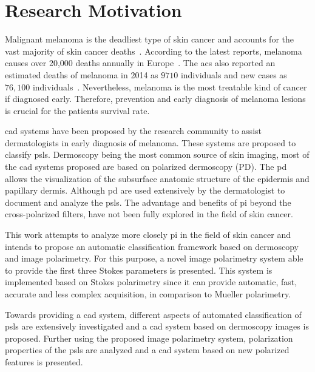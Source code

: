 \section{Research Motivation}
\label{sec:chp1sec6}
Malignant melanoma is the deadliest type of skin cancer and accounts for the vast majority of skin cancer deaths~\cite{CancerFactsFigures2014}.
According to the latest reports, melanoma causes over 20,000 deaths annually in Europe~\cite{forsea2012melanoma}.
The \Ac{acs} also reported an estimated deaths of melanoma in 2014 as $9710$ individuals and new cases as $76,100$ individuals~\cite{CancerFactsFigures2014}.
Nevertheless, melanoma is the most treatable kind of cancer if diagnosed early.
Therefore, prevention and early diagnosis of melanoma lesions is crucial for the patients survival rate.

\acl{cad} systems have been proposed by the research community to assist dermatologists in early diagnosis of melanoma.
These systems are proposed to classify \acf{psls}.
Dermoscopy being the most common source of skin imaging, most of the \ac{cad} systems proposed are based on polarized dermoscopy (PD).
The \ac{pd} allows the visualization of the subsurface anatomic structure of the epidermis and papillary dermis.
Although \ac{pd} are used extensively by the dermatologist to document and analyze the \ac{psls}. 
The advantage and benefits of \acf{pi} beyond the cross-polarized filters, have not been fully explored in the field of skin cancer.

This work attempts to analyze more closely \ac{pi} in the field of skin cancer and intends to propose an automatic classification framework based on dermoscopy and image polarimetry.
For this purpose, a novel image polarimetry system able to provide the first three Stokes parameters is presented.
This system is implemented based on Stokes polarimetry since it can provide automatic, fast, accurate and less complex acquisition, in comparison to Mueller polarimetry. 

Towards providing a \ac{cad} system, different aspects of automated classification of \ac{psls} are extensively investigated and a \ac{cad} system based on dermoscopy images is proposed. 
Further using the proposed image polarimetry system, polarization properties of the \ac{psls} are analyzed and a \ac{cad} system based on new polarized features is presented.


